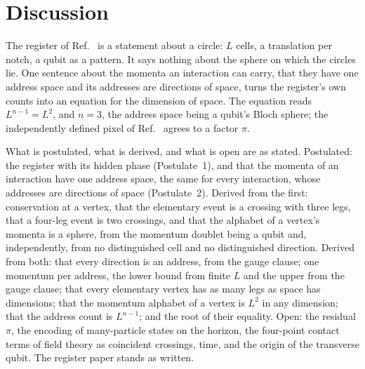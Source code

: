 \documentclass[aps,prd,twocolumn,superscriptaddress,nofootinbib]{revtex4-2}
\begin{document}
\section{Discussion}
\label{sec:discussion}

The register of Ref.~\cite{korytko2026c} is a statement about a circle: $L$ cells, a translation per notch, a qubit as a pattern. It says nothing about the sphere on which the circles lie. One sentence about the momenta an interaction can carry, that they have one address space and its addresses are directions of space, turns the register's own counts into an equation for the dimension of space. The equation reads $L^{n-1} = L^2$, and $n = 3$, the address space being a qubit's Bloch sphere; the independently defined pixel of Ref.~\cite{korytko2026} agrees to a factor $\pi$.

What is postulated, what is derived, and what is open are as stated. Postulated: the register with its hidden phase (Postulate~1), and that the momenta of an interaction have one address space, the same for every interaction, whose addresses are directions of space (Postulate~2). Derived from the first: conservation at a vertex, that the elementary event is a crossing with three legs, that a four-leg event is two crossings, and that the alphabet of a vertex's momenta is a sphere, from the momentum doublet being a qubit and, independently, from no distinguished cell and no distinguished direction. Derived from both: that every direction is an address, from the gauge clause; one momentum per address, the lower bound from finite $L$ and the upper from the gauge clause; that every elementary vertex has as many legs as space has dimensions; that the momentum alphabet of a vertex is $L^2$ in any dimension; that the address count is $L^{n-1}$; and the root of their equality. Open: the residual $\pi$, the encoding of many-particle states on the horizon, the four-point contact terms of field theory as coincident crossings, time, and the origin of the transverse qubit. The register paper stands as written.
\end{document}
